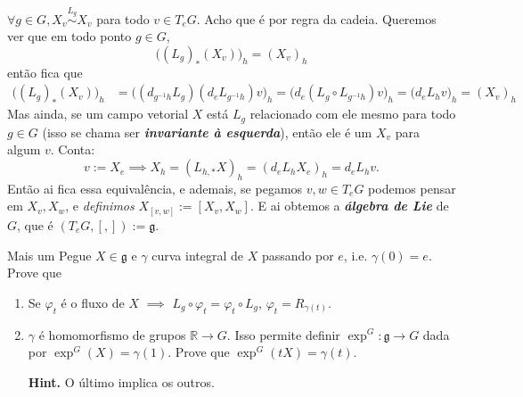\begin{remark}\leavevmode
\(\forall g \in G, X_v \overset{L_g}{\sim}X_v\) para todo \(v \in T_eG\). Acho que é por regra da cadeia. Queremos ver
que em todo ponto \(g \in G\), \[\Big((L_g)_*(X_v)\Big)_h=(X_v)_h\]
então fica que
\begin{align*}
\Big((L_g)_*(X_v)\Big)_h&=\Big((d_{g^{-1}h}L_g)(d_eL_{g^{-1}h})v\Big)_h=\Big(d_e(L_g\circ L_{g^{-1}h})v\Big)_h=\Big(d_eL_{h}v\Big)_h=(X_v)_h
\end{align*}
Mas ainda, se um campo vetorial \(X\) está \(L_g\) relacionado com ele mesmo para todo \(g \in G\) (isso se chama ser \textit{\textbf{invariante à esquerda}}), então ele é um \(X_v\) para algum \(v\). Conta:
\[v:=X_e \implies X_h=(L_{h,*}X)_h=(d_eL_{h}X_e)_h=d_eL_hv.\]
Então ai fica essa equivalência, e ademais, se pegamos \(v,w \in T_eG\) podemos pensar em \(X_v,X_w\), e \textit{definimos} \(X_{[v,w]}:=[X_v,X_w]\). E ai obtemos a \textit{\textbf{álgebra de Lie}} de \(G\), que é \((T_eG,[,]):=\mathfrak{g}\).
\end{remark}

\begin{thing6}{Mais um}\leavevmode
Pegue \(X \in \mathfrak{g}\) e \(\gamma\) curva integral de \(X\) passando por \(e\), i.e. \(\gamma(0)=e\). Prove que
\begin{enumerate}
\item Se \(\varphi_t\) é o fluxo de \(X\) \(\implies\) \(L_g \circ\varphi_t = \varphi_t\circ L_g\), \(\varphi_t = R_{\gamma(t)}\).
\item \(\gamma\) é homomorfismo de grupos \(\mathbb{R} \to G\). Isso permite definir \(\operatorname{exp}^G: \mathfrak{g} \to G\) dada por \(\operatorname{exp}^G(X)=\gamma(1)\). Prove que \(\operatorname{exp}^G(tX)=\gamma(t)\).

\textbf{Hint.} O último implica os outros.
\end{enumerate}
\end{thing6}


